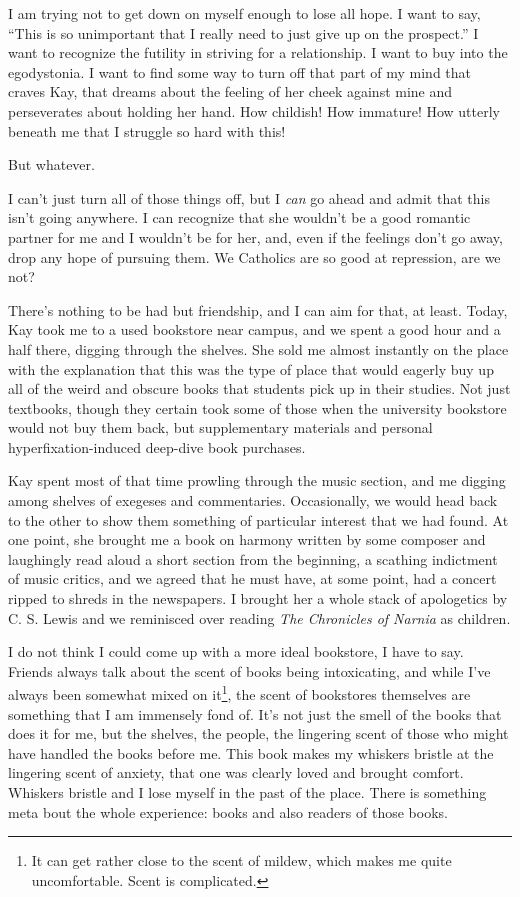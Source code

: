 I am trying not to get down on myself enough to lose all hope. I want to say, ``This is so unimportant that I really need to just give up on the prospect.'' I want to recognize the futility in striving for a relationship. I want to buy into the egodystonia. I want to find some way to turn off that part of my mind that craves Kay, that dreams about the feeling of her cheek against mine and perseverates about holding her hand. How childish! How immature! How utterly beneath me that I struggle so hard with this!

But whatever.

I can't just turn all of those things off, but I \emph{can} go ahead and admit that this isn't going anywhere. I can recognize that she wouldn't be a good romantic partner for me and I wouldn't be for her, and, even if the feelings don't go away, drop any hope of pursuing them. We Catholics are so good at repression, are we not?

There's nothing to be had but friendship, and I can aim for that, at least. Today, Kay took me to a used bookstore near campus, and we spent a good hour and a half there, digging through the shelves. She sold me almost instantly on the place with the explanation that this was the type of place that would eagerly buy up all of the weird and obscure books that students pick up in their studies. Not just textbooks, though they certain took some of those when the university bookstore would not buy them back, but supplementary materials and personal hyperfixation-induced deep-dive book purchases.

Kay spent most of that time prowling through the music section, and me digging among shelves of exegeses and commentaries. Occasionally, we would head back to the other to show them something of particular interest that we had found. At one point, she brought me a book on harmony written by some composer and laughingly read aloud a short section from the beginning, a scathing indictment of music critics, and we agreed that he must have, at some point, had a concert ripped to shreds in the newspapers. I brought her a whole stack of apologetics by C. S. Lewis and we reminisced over reading \emph{The Chronicles of Narnia} as children.

I do not think I could come up with a more ideal bookstore, I have to say. Friends always talk about the scent of books being intoxicating, and while I've always been somewhat mixed on it\footnote{It can get rather close to the scent of mildew, which makes me quite uncomfortable. Scent is complicated.}, the scent of bookstores themselves are something that I am immensely fond of. It's not just the smell of the books that does it for me, but the shelves, the people, the lingering scent of those who might have handled the books before me. This book makes my whiskers bristle at the lingering scent of anxiety, that one was clearly loved and brought comfort. Whiskers bristle and I lose myself in the past of the place. There is something meta bout the whole experience: books and also readers of those books.

